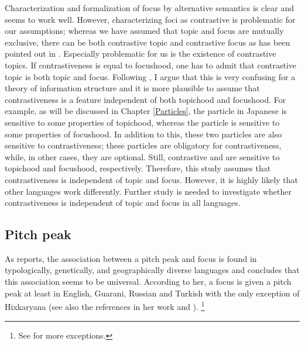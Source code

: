 Characterization and formalization of focus by alternative semantics is
clear and seems to work well.
However, characterizing foci as contrastive is problematic
for our assumptions;
whereas we have assumed that topic and focus are mutually exclusive,
there can be both contrastive topic and contrastive focus
as has been pointed out in .
Especially problematic for us is the existence of contrastive topics.
If contrastiveness is equal to focushood,
one has to admit that contrastive topic is both topic and focus.
Following ,
I argue that this is very confusing for a theory of information structure and
it is more plausible to assume that contrastiveness is a feature independent of both topichood and focushood.
For example,
as will be discussed in Chapter \ref{Particles},
the particle  in Japanese is sensitive to some properties of topichood,
whereas the particle  is sensitive to some properties of focushood.
In addition to this,
these two particles are also sensitive to contrastiveness;
these particles are obligatory for contrastiveness,
while, in other cases, they are optional.
Still, contrastive  and  are sensitive to topichood and focushood, respectively.
Therefore, this study
assumes that
contrastiveness is independent of topic and focus.
However, it is highly likely that other languages work differently.
Further study is needed to investigate whether contrastiveness is independent of topic and focus in all languages.

%
%
\subsection{Pitch peak}

As  reports,
the association between a pitch peak and focus
is found in typologically, genetically, and geographically diverse languages
and concludes that this association seems to be universal.
According to her,
a focus is given a pitch peak at least in English, Guarani, Russian and Turkish
with the only exception of Hixkaryana (see also the references in her work and ).%
\footnote{
See  for more exceptions.
}

